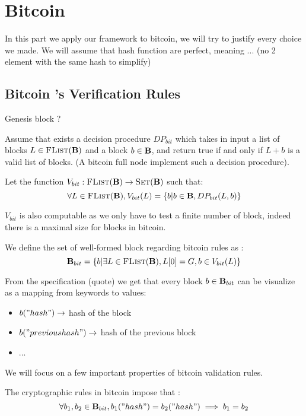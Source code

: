 


\section{Bitcoin}
In this part we apply our framework to bitcoin, we will try to justify every choice we made. 
We will assume that hash function are perfect, meaning ... (no 2 element with the same hash to simplify)

\subsection{Bitcoin 's Verification Rules}
Genesis block ?

Assume that exists a decision procedure $DP_{bit}$ which takes in input a list of blocks $L \in \text{\sc FList}(\text{\bf B})$ and a block $b \in \text{\bf B}$, and return true if and only if $L+b$ is a valid list of blocks. (A bitcoin full node implement such a decision procedure).

Let the function $V_{bit} : \text{\sc FList}(\text{\bf B}) \rightarrow \text{\sc Set}(\text{\bf B})$ such that:
$$\forall L \in \text{\sc FList}(\text{\bf B}), V_{bit}(L) = \{ b | b \in \text{\bf B}, DP_{bit}(L,b) \}$$

\begin{myrem}
	$V_{bit}$ is also computable as we only have to test a finite number of block, indeed there is a maximal size for blocks in bitcoin.
\end{myrem}

We define the set of well-formed block regarding bitcoin rules as : 
$$\text{\bf B}_{bit} = \{b| \exists L \in \text{\sc FList}(\text{\bf B}), L[0] = G, b \in V_{bit}(L) \}$$

\begin{mylem*}
	From the specification (quote) we get that every block $b \in \text{\bf B}_{bit}$ can be visualize as a mapping from keywords to values: 
	\begin{itemize}
		\item $b("hash") \rightarrow$ hash of the block
		\item $b("previous hash") \rightarrow$ hash of the previous block
		\item ...
	\end{itemize}
\end{mylem*}

We will focus on a few important properties of bitcoin validation rules.
\begin{mylem*}
	The cryptographic rules in bitcoin impose that :
	$$ \forall b_1,b_2 \in \text{\bf B}_{bit}, b_1("hash")=b_2("hash") \implies b_1 = b_2 $$
\end{mylem*}

